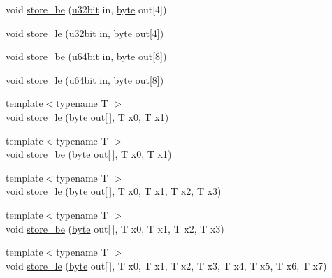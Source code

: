 \begin{DoxyCompactItemize}
\item 
void \hyperlink{namespaceBotan_a04ec1d4b8cc6ae4aafb4f488ae6377ab}{store\-\_\-be} (\hyperlink{namespaceBotan_aacc7d03c95e97e76168fc1c819031830}{u32bit} in, \hyperlink{namespaceBotan_a7d793989d801281df48c6b19616b8b84}{byte} out\mbox{[}4\mbox{]})
\item 
void \hyperlink{namespaceBotan_a04ee5d421ca22a452d892e536bb68876}{store\-\_\-le} (\hyperlink{namespaceBotan_aacc7d03c95e97e76168fc1c819031830}{u32bit} in, \hyperlink{namespaceBotan_a7d793989d801281df48c6b19616b8b84}{byte} out\mbox{[}4\mbox{]})
\item 
void \hyperlink{namespaceBotan_a5346e2b33b6b4e7258f26ba771e841c6}{store\-\_\-be} (\hyperlink{namespaceBotan_a634063d9fb05e25262ca94ed927030f6}{u64bit} in, \hyperlink{namespaceBotan_a7d793989d801281df48c6b19616b8b84}{byte} out\mbox{[}8\mbox{]})
\item 
void \hyperlink{namespaceBotan_ad813d7d21e5af17926b8a59925440783}{store\-\_\-le} (\hyperlink{namespaceBotan_a634063d9fb05e25262ca94ed927030f6}{u64bit} in, \hyperlink{namespaceBotan_a7d793989d801281df48c6b19616b8b84}{byte} out\mbox{[}8\mbox{]})
\item 
{\footnotesize template$<$typename T $>$ }\\void \hyperlink{namespaceBotan_a146b4d6db922f4c0649db6bb8fb65411}{store\-\_\-le} (\hyperlink{namespaceBotan_a7d793989d801281df48c6b19616b8b84}{byte} out\mbox{[}$\,$\mbox{]}, T x0, T x1)
\item 
{\footnotesize template$<$typename T $>$ }\\void \hyperlink{namespaceBotan_abaecbfb65a807e69868315f582378717}{store\-\_\-be} (\hyperlink{namespaceBotan_a7d793989d801281df48c6b19616b8b84}{byte} out\mbox{[}$\,$\mbox{]}, T x0, T x1)
\item 
{\footnotesize template$<$typename T $>$ }\\void \hyperlink{namespaceBotan_a4b024e0b9d0fc784bf767c344078e947}{store\-\_\-le} (\hyperlink{namespaceBotan_a7d793989d801281df48c6b19616b8b84}{byte} out\mbox{[}$\,$\mbox{]}, T x0, T x1, T x2, T x3)
\item 
{\footnotesize template$<$typename T $>$ }\\void \hyperlink{namespaceBotan_a3f7e3bbe478c1f6f73315cb2a66c7775}{store\-\_\-be} (\hyperlink{namespaceBotan_a7d793989d801281df48c6b19616b8b84}{byte} out\mbox{[}$\,$\mbox{]}, T x0, T x1, T x2, T x3)
\item 
{\footnotesize template$<$typename T $>$ }\\void \hyperlink{namespaceBotan_aa524e4cde03a32bed235026677c8fba3}{store\-\_\-le} (\hyperlink{namespaceBotan_a7d793989d801281df48c6b19616b8b84}{byte} out\mbox{[}$\,$\mbox{]}, T x0, T x1, T x2, T x3, T x4, T x5, T x6, T x7)

\end{DoxyCompactItemize}
